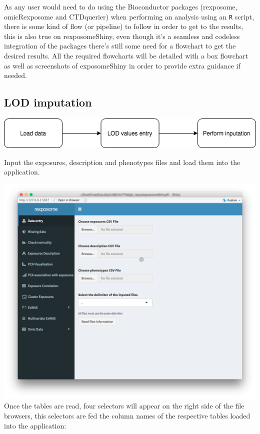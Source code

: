 \documentclass[
]{book}
\begin{document}
As any user would need to do using the Bioconductor packages (rexposome, omicRexposome and CTDquerier) when performing an analysis using an \texttt{R} script, there is some kind of flow (or pipeline) to follow in order to get to the results, this is also true on rexposomeShiny, even though it's a seamless and codeless integration of the packages there's still some need for a flowchart to get the desired results. All the required flowcharts will be detailed with a box flowchart as well as screenshots of exposomeShiny in order to provide extra guidance if needed.

\hypertarget{lod-imputation}{%
\subsection{LOD imputation}\label{lod-imputation}}

\includegraphics{images/analysis1_1.png}

Input the exposures, description and phenotypes files and load them into the application.

\includegraphics{images/analysis1_2.png}
Once the tables are read, four selectors will appear on the right side of the file browsers, this selectors are fed the column names of the respective tables loaded into the application:
\end{document}

